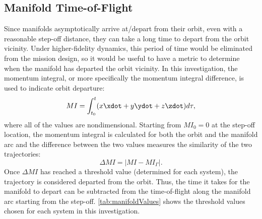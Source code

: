 \subsection{Manifold Time-of-Flight}
Since manifolds asymptotically arrive at/depart from their orbit, even with a reasonable step-off
distance, they can take a long time to depart from the orbit vicinity. Under higher-fidelity
dynamics, this period of time would be eliminated from the mission design, so it would be useful to
have a metric to determine when the manifold has departed the orbit vicinity. In this
investigation, the momentum integral, or more specifically the momentum integral difference, is
used to indicate orbit departure:
\begin{equation}
    MI=\int_{t_{0}}^{t}(x\xdot+y\ydot+z\zdot)d\tau,
    \label{eq:momentumintegral}
\end{equation}
where all of the values are nondimensional. Starting from $MI_{0}=0$ at the step-off location, the
momentum integral is calculated for both the orbit and the manifold arc and the difference between
the two values measures the similarity of the two trajectories:
\begin{equation}
    \Delta MI=|MI-MI_{\Gamma}|.
    \label{eq:momentumdifference}
\end{equation}
Once $\Delta MI$ has reached a threshold value (determined for each system), the trajectory is
considered departed from the orbit\cite{Guzzetti:2017}. Thus, the time it takes for the manifold to
depart can be subtracted from the time-of-flight along the manifold arc starting from the step-off.
\cref{tab:manifoldValues} shows the threshold values chosen for each system in this investigation.
